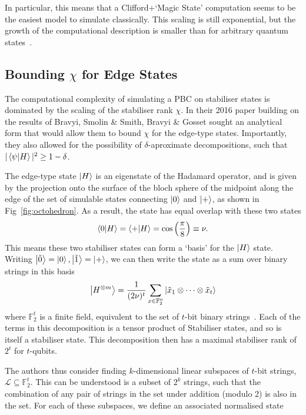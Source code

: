 \documentclass{standalone}
\begin{document}
In particular, this means that a Clifford+`Magic State' computation seems to be the easiest model to simulate classically. This scaling is still exponential, but the growth of the computational description is smaller than for arbitrary quantum states~\cite{Bravyi2015}. 
\subsection{Bounding $\chi$ for Edge States}\label{sec:edgebound}
The computational complexity of simulating a PBC on stabiliser states is dominated by the scaling of the stabiliser rank $\chi$. In their 2016 paper building on the results of Bravyi, Smolin \& Smith, Bravyi \& Gosset sought an analytical form that would allow them to bound $\chi$ for the edge-type states. Importantly, they also allowed for the possibility of $\delta$-aproximate decompositions, such that $\vert\braket{\psi}{H}\vert^{2}\geq 1-\delta$. 
\par
The edge-type state $\ket{H}$ is an eigenstate of the Hadamard operator, and is given by the projection onto the surface of the bloch sphere of the midpoint along the edge of the set of simulable states connecting $\ket{0}$ and $\ket{+}$, as shown in Fig~\ref{fig:octohedron}. As a result, the state has equal overlap with these two states 
\[\braket{0}{H}=\braket{+}{H}=\cos\left(\frac{\pi}{8}\right)\equiv \nu.\]
This means these two stabiliser states can form a `basis' for the $\ket{H}$ state. Writing $\ket{\tilde{0}}=\ket{0},\ket{\tilde{1}}=\ket{+}$, we can then write the state as a sum over binary strings in this basis
\begin{equation}
  \label{eq:hstrings}
  \ket{H^{\otimes m}}=\frac{1}{(2\nu)^{t}}\sum_{x\in\mathbb{F}_{2}^{n}}\ket{\tilde{x}_{1}\otimes\cdots\otimes\tilde{x}_{t}}
\end{equation}
where $\mathbb{F}_{2}^{t}$ is a finite field, equivalent to the set of $t$-bit binary strings~\cite{Bravyi2016b}. Each of the terms in this decomposition is a tensor product of Stabiliser states, and so is itself a stabiliser state. This decomposition then has a maximal stabiliser rank of $2^{t}$ for $t$-qubits. 
\par
The authors thus consider finding $k$-dimensional linear subspaces of $t$-bit strings, $\mathcal{L}\subseteq\mathbb{F}_{2}^{t}$. This can be understood is a subset of $2^{k}$ strings, such that the combination of any pair of strings in the set under addition (modulo 2) is also in the set. For each of these subspaces, we define an associated normalised state~\cite{Bravyi2016b} 
\end{document}
